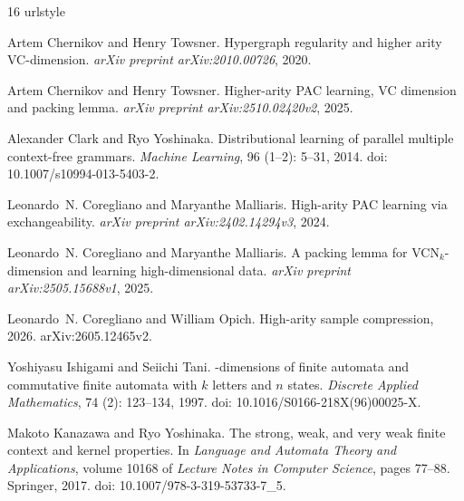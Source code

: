 \documentclass[11pt]{article}
\theoremstyle{definition}
\theoremstyle{remark}
\begin{document}
\begin{thebibliography}{16}
\providecommand{\natexlab}[1]{#1}
\providecommand{\url}[1]{\texttt{#1}}
\expandafter\ifx\csname urlstyle\endcsname\relax
  \providecommand{\doi}[1]{doi: #1}\else
  \providecommand{\doi}{doi: \begingroup \urlstyle{rm}\Url}\fi

Artem Chernikov and Henry Towsner.
\newblock Hypergraph regularity and higher arity {VC}-dimension.
\newblock \emph{arXiv preprint arXiv:2010.00726}, 2020.

Artem Chernikov and Henry Towsner.
\newblock Higher-arity {PAC} learning, {VC} dimension and packing lemma.
\newblock \emph{arXiv preprint arXiv:2510.02420v2}, 2025.

Alexander Clark and Ryo Yoshinaka.
\newblock Distributional learning of parallel multiple context-free grammars.
\newblock \emph{Machine Learning}, 96 (1--2): 5--31, 2014.
\newblock \doi{10.1007/s10994-013-5403-2}.

Leonardo~N. Coregliano and Maryanthe Malliaris.
\newblock High-arity {PAC} learning via exchangeability.
\newblock \emph{arXiv preprint arXiv:2402.14294v3}, 2024.

Leonardo~N. Coregliano and Maryanthe Malliaris.
\newblock A packing lemma for {VCN}$_k$-dimension and learning high-dimensional
  data.
\newblock \emph{arXiv preprint arXiv:2505.15688v1}, 2025.

Leonardo~N. Coregliano and William Opich.
\newblock High-arity sample compression, 2026.
\newblock arXiv:2605.12465v2.

Yoshiyasu Ishigami and Seiichi Tani.
-dimensions of finite automata and commutative finite automata
  with $k$ letters and $n$ states.
\newblock \emph{Discrete Applied Mathematics}, 74 (2):
  123--134, 1997.
\newblock \doi{10.1016/S0166-218X(96)00025-X}.

Makoto Kanazawa and Ryo Yoshinaka.
\newblock The strong, weak, and very weak finite context and kernel properties.
\newblock In \emph{Language and Automata Theory and Applications}, volume 10168
  of \emph{Lecture Notes in Computer Science}, pages 77--88. Springer, 2017.
\newblock \doi{10.1007/978-3-319-53733-7_5}.


\end{thebibliography}
\end{document}
